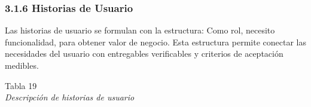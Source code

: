 \documentclass[12pt,a4paper,oneside]{report}
\begin{document}
\subsubsection{}\label{section}

\subsubsection{3.1.6 Historias de Usuario}\label{historias-de-usuario}

Las historias de usuario se formulan con la estructura: Como rol,
necesito funcionalidad, para obtener valor de negocio. Esta estructura
permite conectar las necesidades del usuario con entregables
verificables y criterios de aceptación medibles.

\label{_Toc231672274}{}Tabla 19\\
\emph{Descripción de historias de usuario}
\end{document}
